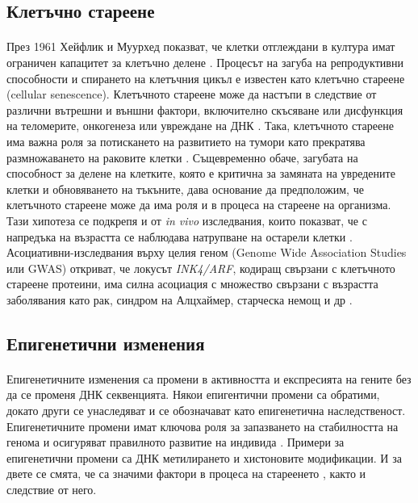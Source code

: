 \documentclass[pdftex,cyrillic,14pt,a4page,twoside,openright]{extreport}
\begin{document}
\subsection{Клетъчно стареене}
\paragraph{}
През 1961 Хейфлик и Муурхед показват, че клетки отглеждани в култура имат ограничен капацитет за клетъчно делене \cite{hayflick1961serial}. Процесът на загуба на репродуктивни способности и спирането на клетъчния цикъл е известен като клетъчно стареене (cellular senescence). Клетъчното стареене може да настъпи в следствие от различни вътрешни и външни фактори, включително скъсяване или дисфункция на теломерите, онкогенеза или увреждане на ДНК \cite{micco2021}. Така, клетъчното стареене има важна роля за потискането на развитието на тумори като прекратява размножаването на раковите клетки \cite{jeyapalan2008}. Същевременно обаче, загубата на способност за делене на клетките, която е критична за замяната на увредените клетки и обновяването на тъкъните, дава основание да предположим, че клетъчното стареене може да има роля и в процеса на стареене на организма. Тази хипотеза се подкрепя и от \emph{in vivo} изследвания, които показват, че с напредъка на възрастта се наблюдава натрупване на остарели клетки \cite{jeyapalan2008}. Асоциативни-изследвания върху целия геном (Genome Wide Association Studies или GWAS) откриват, че локусът \textit{INK4/ARF}, кодиращ свързани с клетъчното стареене протеини, има силна асоциация с множество свързани с възрастта заболявания като рак, синдром на Алцхаймер, старческа немощ и др \cite{jeck2012meta}.

\subsection{Епигенетични изменения}
\paragraph{}
Епигенетичните изменения са промени в активността и експресията на гените без да се променя ДНК секвенцията. Някои епигентични промени са обратими, докато други се унаследяват и се обозначават като епигенетична наследственост. Епигенетичните промени имат ключова роля за запазването на стабилността на генома и осигуряват правилното развитие на индивида \cite{dupont2009}. Примери за епигенетични промени са ДНК метилирането и хистоновите модификации. И за двете се смята, че са значими фактори в процеса на стареенето \cite{daquila2013, aitbaev2019}, както и следствие от него.
\end{document}
